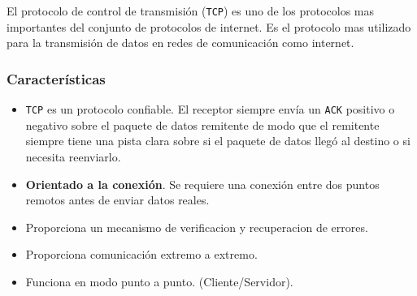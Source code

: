 El protocolo de control de transmisión (\texttt{TCP}) es uno de los protocolos mas importantes del conjunto de protocolos de internet. Es el protocolo mas utilizado para la transmisión de datos en redes de comunicación como internet.
\subsubsection*{Características}
\begin{itemize}
\item \texttt{TCP} es un protocolo confiable. El receptor siempre envía un \texttt{ACK} positivo o negativo sobre el paquete de datos remitente de modo que el remitente siempre tiene una pista clara sobre si el paquete de datos llegó al destino o si necesita reenviarlo.
\item \textbf{Orientado a la conexión}. Se requiere una conexión entre dos puntos remotos antes de enviar datos reales.
\item Proporciona un mecanismo de verificacion y recuperacion de errores.
\item Proporciona comunicación extremo a extremo.
\item Funciona en modo punto a punto. (Cliente/Servidor).
\end{itemize}

